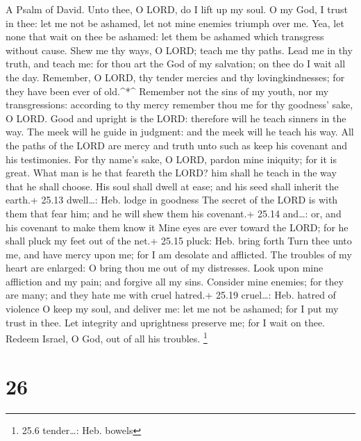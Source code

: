 A Psalm of David.  Unto thee, O LORD, do I lift up my soul.
 O my God, I trust in thee: let me not be ashamed, let not
mine enemies triumph over me.  Yea, let none that wait on
thee be ashamed: let them be ashamed which transgress without cause.
 Shew me thy ways, O LORD; teach me thy paths. 
Lead me in thy truth, and teach me: for thou art the God of my
salvation; on thee do I wait all the day.  Remember, O LORD,
thy tender mercies and thy lovingkindnesses; for they have been ever of
old.\^{}*\^{}  Remember not the sins of my youth, nor my
transgressions: according to thy mercy remember thou me for thy
goodness' sake, O LORD.  Good and upright is the LORD:
therefore will he teach sinners in the way.  The meek will
he guide in judgment: and the meek will he teach his way. 
All the paths of the LORD are mercy and truth unto such as keep his
covenant and his testimonies.  For thy name's sake, O LORD,
pardon mine iniquity; for it is great.  What man is he that
feareth the LORD? him shall he teach in the way that he shall choose.
 His soul shall dwell at ease; and his seed shall inherit
the earth.+ 25.13 dwell\ldots: Heb. lodge in goodness  The
secret of the LORD is with them that fear him; and he will shew them his
covenant.+ 25.14 and\ldots: or, and his covenant to make them know it
 Mine eyes are ever toward the LORD; for he shall pluck my
feet out of the net.+ 25.15 pluck: Heb. bring forth  Turn
thee unto me, and have mercy upon me; for I am desolate and afflicted.
 The troubles of my heart are enlarged: O bring thou me out
of my distresses.  Look upon mine affliction and my pain;
and forgive all my sins.  Consider mine enemies; for they
are many; and they hate me with cruel hatred.+ 25.19 cruel\ldots: Heb.
hatred of violence  O keep my soul, and deliver me: let me
not be ashamed; for I put my trust in thee.  Let integrity
and uprightness preserve me; for I wait on thee.  Redeem
Israel, O God, out of all his troubles. \footnote{25.6 tender\ldots:
  Heb. bowels}

\hypertarget{section-25}{%
\section{26}\label{section-25}}

